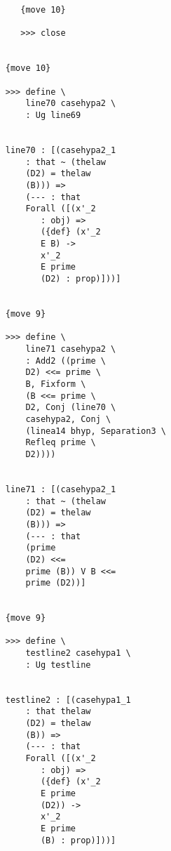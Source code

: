 \documentclass[12pt]{article}
\begin{document}
\begin{verbatim}
                                 {move 10}

                                 >>> close


                              {move 10}

                              >>> define \
                                  line70 casehypa2 \
                                  : Ug line69


                              line70 : [(casehypa2_1 
                                  : that ~ (thelaw 
                                  (D2) = thelaw 
                                  (B))) => 
                                  (--- : that 
                                  Forall ([(x'_2 
                                     : obj) => 
                                     ({def} (x'_2 
                                     E B) -> 
                                     x'_2 
                                     E prime 
                                     (D2) : prop)]))]


                              {move 9}

                              >>> define \
                                  line71 casehypa2 \
                                  : Add2 ((prime \
                                  D2) <<= prime \
                                  B, Fixform \
                                  (B <<= prime \
                                  D2, Conj (line70 \
                                  casehypa2, Conj \
                                  (linea14 bhyp, Separation3 \
                                  Refleq prime \
                                  D2))))


                              line71 : [(casehypa2_1 
                                  : that ~ (thelaw 
                                  (D2) = thelaw 
                                  (B))) => 
                                  (--- : that 
                                  (prime 
                                  (D2) <<= 
                                  prime (B)) V B <<= 
                                  prime (D2))]


                              {move 9}

                              >>> define \
                                  testline2 casehypa1 \
                                  : Ug testline


                              testline2 : [(casehypa1_1 
                                  : that thelaw 
                                  (D2) = thelaw 
                                  (B)) => 
                                  (--- : that 
                                  Forall ([(x'_2 
                                     : obj) => 
                                     ({def} (x'_2 
                                     E prime 
                                     (D2)) -> 
                                     x'_2 
                                     E prime 
                                     (B) : prop)]))]



\end{verbatim}
\end{document}
